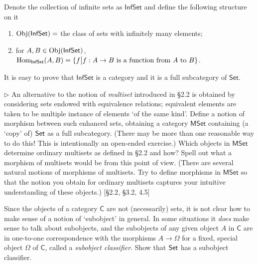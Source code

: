 \begin{solution}
Denote the collection of infinite sets as $\mathsf{InfSet}$ and define the following structure on it
\begin{enumerate}
\item $\mathrm{Obj}(\mathsf{InfSet})=$ the class of sets with infinitely many elements;
\item for $A, B\in \mathrm{Obj}(\mathsf{InfSet})$, $\mathrm{Hom}_{\mathsf{InfSet}}(A,B) = \{f \big{|} f: A\to B \text{ is a function from } A \text{ to } B\}$.
\end{enumerate}
It is easy to prove that $\mathsf{InfSet}$ is a category and it is a full subcategory of $\mathsf{Set}$.
\end{solution}

\hypertarget{Exercise I.3.9}{}
\begin{problem}[3.9]
  $\rhd$ An alternative to the notion of \textit{multiset} introduced in
  \S2.2 is obtained by considering sets endowed with equivalence relations;
  equivalent elements are taken to be multiple instance of elements `of the same
  kind'. Define a notion of morphism between such enhanced sets, obtaining a
  category ${\mathsf{MSet}}$ containing (a `copy' of) $\mathsf{Set}$ as a full subcategory. (There
  may be more than one reasonable way to do this! This is intentionally an
  open-ended exercise.) Which objects in $\mathsf{MSet}$ determine ordinary multisets as
  defined in \S2.2 and how? Spell out what a morphism of multisets would be from
  this point of view. (There are several natural motions of morphisms of
  multisets. Try to define morphisms in $\mathsf{MSet}$ so that the notion you obtain for
  ordinary multisets captures your intuitive understanding of these objects.)
  [\S2.2, \S3.2, 4.5]
\end{problem}

\begin{problem}[3.10]
  Since the objects of a category $\mathsf{C}$ are not (necessarily) sets, it is not clear
  how to make sense of a notion of `subobject' in general. In some situations it
  \textit{does} make sense to talk about subobjects, and the subobjects of any
  given object $A$ in $\mathsf{C}$ are in one-to-one correspondence with the morphisms
  $A\to\Omega$ for a fixed, special object $\Omega$ of $\mathsf{C}$, called a
  \textit{subobject classifier}. Show that $\mathsf{Set}$ has a subobject classifier.
\end{problem}

\begin{solution}
\end{solution}

